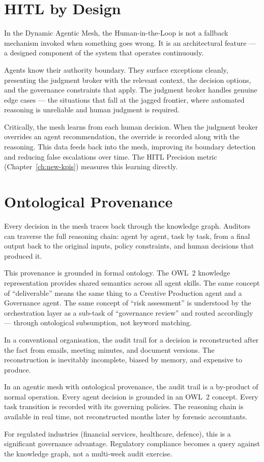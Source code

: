 \section{HITL by Design}

In the Dynamic Agentic Mesh, the Human-in-the-Loop is not a fallback mechanism invoked when something goes wrong. It is an architectural feature --- a designed component of the system that operates continuously.

Agents know their authority boundary. They surface exceptions cleanly, presenting the judgment broker with the relevant context, the decision options, and the governance constraints that apply. The judgment broker handles genuine edge cases --- the situations that fall at the jagged frontier, where automated reasoning is unreliable and human judgment is required.

Critically, the mesh learns from each human decision. When the judgment broker overrides an agent recommendation, the override is recorded along with the reasoning. This data feeds back into the mesh, improving its boundary detection and reducing false escalations over time. The HITL Precision metric (Chapter~\ref{ch:new-kpis}) measures this learning directly.

\section{Ontological Provenance}

Every decision in the mesh traces back through the knowledge graph. Auditors can traverse the full reasoning chain: agent by agent, task by task, from a final output back to the original inputs, policy constraints, and human decisions that produced it.

This provenance is grounded in formal ontology. The OWL~2 knowledge representation provides shared semantics across all agent skills. The same concept of ``deliverable'' means the same thing to a Creative Production agent and a Governance agent. The same concept of ``risk assessment'' is understood by the orchestration layer as a sub-task of ``governance review'' and routed accordingly --- through ontological subsumption, not keyword matching.

\begin{evidencebox}[title={Why Ontological Provenance Matters}]
In a conventional organisation, the audit trail for a decision is reconstructed after the fact from emails, meeting minutes, and document versions. The reconstruction is inevitably incomplete, biased by memory, and expensive to produce.

In an agentic mesh with ontological provenance, the audit trail is a by-product of normal operation. Every agent decision is grounded in an OWL~2 concept. Every task transition is recorded with its governing policies. The reasoning chain is available in real time, not reconstructed months later by forensic accountants.

For regulated industries (financial services, healthcare, defence), this is a significant governance advantage. Regulatory compliance becomes a query against the knowledge graph, not a multi-week audit exercise.
\end{evidencebox}

